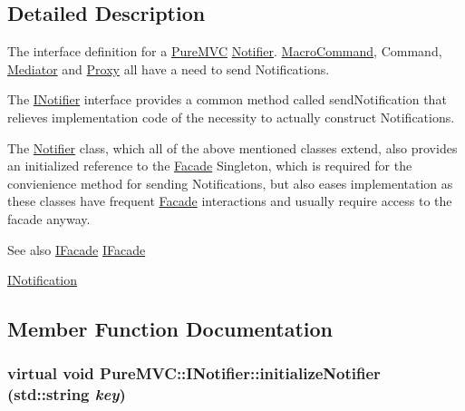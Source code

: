 \subsection{Detailed Description}
The interface definition for a \hyperlink{namespace_pure_m_v_c}{PureMVC} \hyperlink{class_pure_m_v_c_1_1_notifier}{Notifier}. {\ttfamily \hyperlink{class_pure_m_v_c_1_1_macro_command}{MacroCommand}, Command, \hyperlink{class_pure_m_v_c_1_1_mediator}{Mediator}} and {\ttfamily \hyperlink{class_pure_m_v_c_1_1_proxy}{Proxy}} all have a need to send {\ttfamily Notifications}. 

The {\ttfamily \hyperlink{class_pure_m_v_c_1_1_i_notifier}{INotifier}} interface provides a common method called {\ttfamily sendNotification} that relieves implementation code of the necessity to actually construct {\ttfamily Notifications}.

The {\ttfamily \hyperlink{class_pure_m_v_c_1_1_notifier}{Notifier}} class, which all of the above mentioned classes extend, also provides an initialized reference to the {\ttfamily \hyperlink{class_pure_m_v_c_1_1_facade}{Facade}} Singleton, which is required for the convienience method for sending {\ttfamily Notifications}, but also eases implementation as these classes have frequent {\ttfamily \hyperlink{class_pure_m_v_c_1_1_facade}{Facade}} interactions and usually require access to the facade anyway.

\begin{DoxySeeAlso}{See also}
\hyperlink{class_pure_m_v_c_1_1_i_facade}{IFacade} \hyperlink{class_pure_m_v_c_1_1_i_facade}{IFacade} 

\hyperlink{class_pure_m_v_c_1_1_i_notification}{INotification} 
\end{DoxySeeAlso}


\subsection{Member Function Documentation}
\hypertarget{class_pure_m_v_c_1_1_i_notifier_a28d7dbbe0726d4d52080546c5d79b232}{
\subsubsection[{initializeNotifier}]{\setlength{\rightskip}{0pt plus 5cm}virtual void PureMVC::INotifier::initializeNotifier (std::string {\em key})}}
\label{class_pure_m_v_c_1_1_i_notifier_a28d7dbbe0726d4d52080546c5d79b232}


